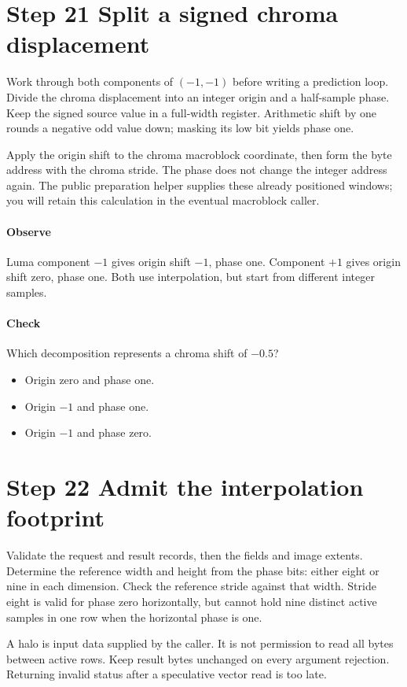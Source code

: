 \section{Step 21 Split a signed chroma displacement}\label{h263-prediction-s01}
Work through both components of $(-1,-1)$ before writing a prediction loop.
Divide the chroma displacement into an integer origin and a half-sample phase.
Keep the signed source value in a full-width register. Arithmetic shift by one
rounds a negative odd value down; masking its low bit yields phase one.

Apply the origin shift to the chroma macroblock coordinate, then form the byte
address with the chroma stride. The phase does not change the integer address
again. The public preparation helper supplies these already positioned windows;
you will retain this calculation in the eventual macroblock caller.

\paragraph{Observe} Luma component $-1$ gives origin shift $-1$, phase one.
Component $+1$ gives origin shift zero, phase one. Both use interpolation, but
start from different integer samples.
\paragraph{Check} Which decomposition represents a chroma shift of $-0.5$?
\begin{itemize}
  \item[A.] Origin zero and phase one.
  \item[B.] Origin $-1$ and phase one.
  \item[C.] Origin $-1$ and phase zero.
\end{itemize}

\section{Step 22 Admit the interpolation footprint}\label{h263-prediction-s02}
Validate the request and result records, then the fields and image extents.
Determine the reference width and height from the phase bits: either eight or
nine in each dimension. Check the reference stride against that width. Stride
eight is valid for phase zero horizontally, but cannot hold nine distinct active
samples in one row when the horizontal phase is one.

A halo is input data supplied by the caller. It is not permission to read all
bytes between active rows. Keep result bytes unchanged on every argument
rejection. Returning invalid status after a speculative vector read is too late.


